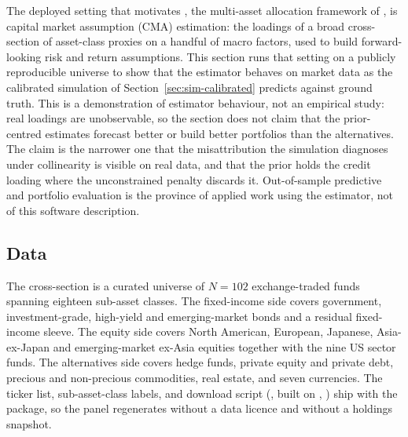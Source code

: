 \documentclass[article]{jss}
\begin{document}
The deployed setting that motivates , the multi-asset
allocation framework of \citet{Sepp+Ossa+Kastenholz:2026}, is capital
market assumption (CMA) estimation: the loadings of a broad
cross-section of asset-class proxies on a handful of macro factors,
used to build forward-looking risk and return assumptions. This section
runs that setting on a publicly reproducible universe to show that the
estimator behaves on market data as the calibrated simulation of
Section~\ref{sec:sim-calibrated} predicts against ground truth. This is
a demonstration of estimator behaviour, not an empirical study: real
loadings are unobservable, so the section does not claim that the
prior-centred estimates forecast better or build better portfolios than
the alternatives. The claim is the narrower one that the
misattribution the simulation diagnoses under collinearity is visible on
real data, and that the prior holds the credit loading where the
unconstrained penalty discards it. Out-of-sample predictive and
portfolio evaluation is the province of applied work using the
estimator, not of this software description.


\subsection[Data]{Data} \label{sec:application-etf-data}

The cross-section is a curated universe of $N = 102$ exchange-traded
funds spanning eighteen sub-asset classes. The fixed-income side covers
government, investment-grade, high-yield and emerging-market bonds and a
residual fixed-income sleeve. The equity side covers North American,
European, Japanese, Asia-ex-Japan and emerging-market ex-Asia equities
together with the nine US sector funds. The alternatives side covers
hedge funds, private equity and private debt, precious and non-precious
commodities, real estate, and seven currencies. The ticker list, sub-asset-class
labels, and download script (, built on
, \citealp{yfinance}) ship with the package, so the panel regenerates without
a data licence and without a holdings snapshot.
\end{document}
